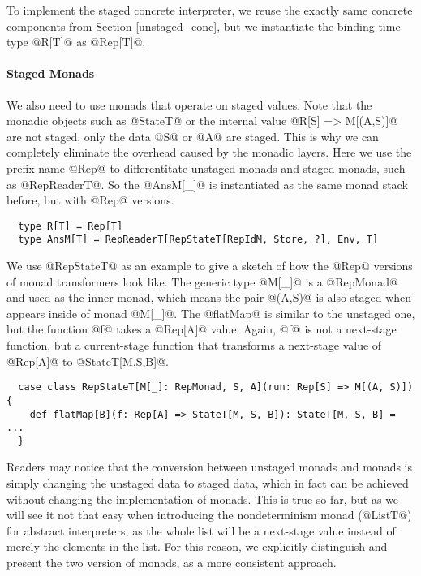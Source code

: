To implement the staged concrete interpreter, we reuse the exactly same concrete
components from Section \ref{unstaged_conc}, but we instantiate the binding-time
type @R[T]@ as @Rep[T]@.

\paragraph{Staged Monads} We also need to use monads that operate on staged
values. Note that the monadic objects such as @StateT@ or the internal value
@R[S] => M[(A,S)]@ are not staged, only the data @S@ or @A@ are staged.
This is why we can completely eliminate the overhead caused by the monadic layers.
Here we use the prefix name @Rep@ to differentitate unstaged monads and staged
monads, such as @RepReaderT@. So the @AnsM[_]@ is instantiated as the same monad
stack before, but with @Rep@ versions.

\begin{lstlisting}
  type R[T] = Rep[T]
  type AnsM[T] = RepReaderT[RepStateT[RepIdM, Store, ?], Env, T]
\end{lstlisting}

We use @RepStateT@ as an example to give a sketch of how the @Rep@ versions of monad
transformers look like. The generic type @M[_]@ is a @RepMonad@ and used as the
inner monad, which means the pair @(A,S)@ is also staged when appears inside of monad
@M[_]@. The @flatMap@ is similar to the unstaged one, but the function @f@ takes
a @Rep[A]@ value. Again, @f@ is not a next-stage function, but a current-stage
function that transforms a next-stage value of @Rep[A]@ to @StateT[M,S,B]@.

\begin{lstlisting}
  case class RepStateT[M[_]: RepMonad, S, A](run: Rep[S] => M[(A, S)]) {
    def flatMap[B](f: Rep[A] => StateT[M, S, B]): StateT[M, S, B] = ...
  }
\end{lstlisting}

Readers may notice that the conversion between unstaged monads and monads is 
simply changing the unstaged data to staged data, which in fact can be achieved without
changing the implementation of monads. This is true so far, but as we will see
it not that easy when introducing the nondeterminism monad (@ListT@) for
abstract interpreters, as the whole list will be a next-stage value instead of
merely the elements in the list.
For this reason, we explicitly distinguish and present the two version of
monads, as a more consistent approach.

